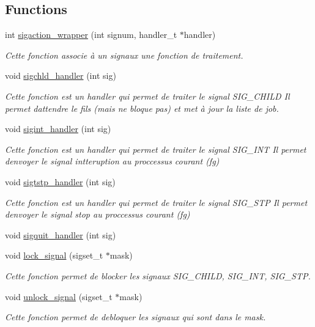 \subsection*{Functions}
\begin{DoxyCompactItemize}
\item 
int \hyperlink{group___sighandler_ga897310bf5d40244e5da806fae0dee397}{sigaction\+\_\+wrapper} (int signum, handler\+\_\+t $\ast$handler)
\begin{DoxyCompactList}\small\item\em Cette fonction associe à un signaux une fonction de traitement. \end{DoxyCompactList}\item 
void \hyperlink{group___sighandler_ga7ec144a9a628442e52b80210bc8364ad}{sigchld\+\_\+handler} (int sig)
\begin{DoxyCompactList}\small\item\em Cette fonction est un handler qui permet de traiter le signal S\+I\+G\+\_\+\+C\+H\+I\+L\+D Il permet d\textquotesingle{}attendre le fils (mais ne bloque pas) et met à jour la liste de job. \end{DoxyCompactList}\item 
void \hyperlink{group___sighandler_ga258e3b580e688a0cf46e4258525aeaf1}{sigint\+\_\+handler} (int sig)
\begin{DoxyCompactList}\small\item\em Cette fonction est un handler qui permet de traiter le signal S\+I\+G\+\_\+\+I\+N\+T Il permet d\textquotesingle{}envoyer le signal intteruption au proccessus courant (fg) \end{DoxyCompactList}\item 
void \hyperlink{group___sighandler_ga809b7c47b9e4abc05325a4b3d33f59a5}{sigtstp\+\_\+handler} (int sig)
\begin{DoxyCompactList}\small\item\em Cette fonction est un handler qui permet de traiter le signal S\+I\+G\+\_\+\+S\+T\+P Il permet d\textquotesingle{}envoyer le signal stop au proccessus courant (fg) \end{DoxyCompactList}\item 
void \hyperlink{group___sighandler_ga368a774e2b304a3de55f58168563967d}{sigquit\+\_\+handler} (int sig)
\item 
void \hyperlink{group___sighandler_gaf57b49bbe63afb81b5cbf55e9add1947}{lock\+\_\+signal} (sigset\+\_\+t $\ast$mask)
\begin{DoxyCompactList}\small\item\em Cette fonction permet de blocker les signaux S\+I\+G\+\_\+\+C\+H\+I\+L\+D, S\+I\+G\+\_\+\+I\+N\+T, S\+I\+G\+\_\+\+S\+T\+P. \end{DoxyCompactList}\item 
void \hyperlink{group___sighandler_ga54d7cd6d673e2bcc401f961e18ed3270}{unlock\+\_\+signal} (sigset\+\_\+t $\ast$mask)
\begin{DoxyCompactList}\small\item\em Cette fonction permet de debloquer les signaux qui sont dans le mask. \end{DoxyCompactList}\end{DoxyCompactItemize}


